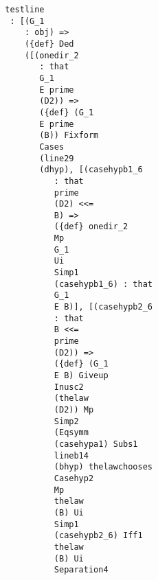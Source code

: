 \documentclass[12pt]{article}
\begin{document}
\begin{verbatim}
                                 testline 
                                  : [(G_1 
                                     : obj) => 
                                     ({def} Ded 
                                     ([(onedir_2 
                                        : that 
                                        G_1 
                                        E prime 
                                        (D2)) => 
                                        ({def} (G_1 
                                        E prime 
                                        (B)) Fixform 
                                        Cases 
                                        (line29 
                                        (dhyp), [(casehypb1_6 
                                           : that 
                                           prime 
                                           (D2) <<= 
                                           B) => 
                                           ({def} onedir_2 
                                           Mp 
                                           G_1 
                                           Ui 
                                           Simp1 
                                           (casehypb1_6) : that 
                                           G_1 
                                           E B)], [(casehypb2_6 
                                           : that 
                                           B <<= 
                                           prime 
                                           (D2)) => 
                                           ({def} (G_1 
                                           E B) Giveup 
                                           Inusc2 
                                           (thelaw 
                                           (D2)) Mp 
                                           Simp2 
                                           (Eqsymm 
                                           (casehypa1) Subs1 
                                           lineb14 
                                           (bhyp) thelawchooses 
                                           Casehyp2 
                                           Mp 
                                           thelaw 
                                           (B) Ui 
                                           Simp1 
                                           (casehypb2_6) Iff1 
                                           thelaw 
                                           (B) Ui 
                                           Separation4 

\end{verbatim}
\end{document}
